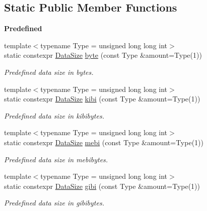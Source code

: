 \subsection*{Static Public Member Functions}
\begin{Indent}{\bf Predefined}\par
\begin{DoxyCompactItemize}
\item 
{\footnotesize template$<$typename Type  = unsigned long long int$>$ }\\static constexpr \hyperlink{exceptionmagrathea_1_1DataSize}{Data\-Size} \hyperlink{exceptionmagrathea_1_1DataSize_ae26d8393c21bca35e65555fb29e9e0c7}{byte} (const Type \&amount=Type(1))
\begin{DoxyCompactList}\small\item\em Predefined data size in bytes. \end{DoxyCompactList}\item 
{\footnotesize template$<$typename Type  = unsigned long long int$>$ }\\static constexpr \hyperlink{exceptionmagrathea_1_1DataSize}{Data\-Size} \hyperlink{exceptionmagrathea_1_1DataSize_abe9525a24519869ef7fd1d593df6442f}{kibi} (const Type \&amount=Type(1))
\begin{DoxyCompactList}\small\item\em Predefined data size in kibibytes. \end{DoxyCompactList}\item 
{\footnotesize template$<$typename Type  = unsigned long long int$>$ }\\static constexpr \hyperlink{exceptionmagrathea_1_1DataSize}{Data\-Size} \hyperlink{exceptionmagrathea_1_1DataSize_add3ff8e910fbd0d0deacebe2f48410ec}{mebi} (const Type \&amount=Type(1))
\begin{DoxyCompactList}\small\item\em Predefined data size in mebibytes. \end{DoxyCompactList}\item 
{\footnotesize template$<$typename Type  = unsigned long long int$>$ }\\static constexpr \hyperlink{exceptionmagrathea_1_1DataSize}{Data\-Size} \hyperlink{exceptionmagrathea_1_1DataSize_ad422da3996190021a0786430d1793e61}{gibi} (const Type \&amount=Type(1))
\begin{DoxyCompactList}\small\item\em Predefined data size in gibibytes. \end{DoxyCompactList}\item 

\end{DoxyCompactItemize}
\end{Indent}
